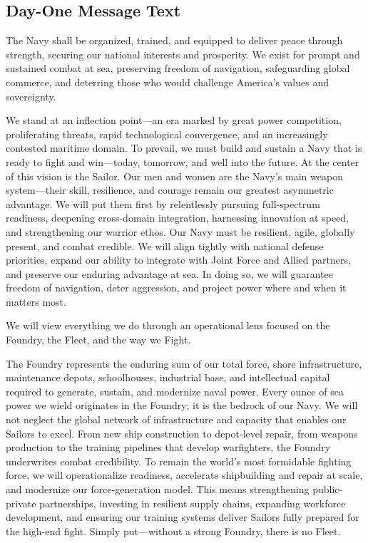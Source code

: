 \documentclass[../main.tex]{subfiles}
\begin{document}
\subsection{Day-One Message Text}
\begin{description}[style=nextline, labelsep=0.5em, font=\bfseries]
  \item[\textbf{Mission.}] The Navy shall be organized, trained, and equipped to deliver peace through strength, securing our national interests and prosperity. We exist for prompt and sustained combat at sea, preserving freedom of navigation, safeguarding global commerce, and deterring those who would challenge America's values and sovereignty.

  \item[\textbf{Vision.}] We stand at an inflection point---an era marked by great power competition, proliferating threats, rapid technological convergence, and an increasingly contested maritime domain. To prevail, we must build and sustain a Navy that is ready to fight and win---today, tomorrow, and well into the future. At the center of this vision is the Sailor. Our men and women are the Navy's main weapon system---their skill, resilience, and courage remain our greatest asymmetric advantage. We will put them first by relentlessly pursuing full-spectrum readiness, deepening cross-domain integration, harnessing innovation at speed, and strengthening our warrior ethos. Our Navy must be resilient, agile, globally present, and combat credible. We will align tightly with national defense priorities, expand our ability to integrate with Joint Force and Allied partners, and preserve our enduring advantage at sea. In doing so, we will guarantee freedom of navigation, deter aggression, and project power where and when it matters most.

  \item[\textbf{Priorities.}] We will view everything we do through an operational lens focused on the Foundry, the Fleet, and the way we Fight.
        \begin{description}[style=nextline, labelsep=0.5em, font=\bfseries]
          \item[\textbf{Foundry.}] The Foundry represents the enduring sum of our total force, shore infrastructure, maintenance depots, schoolhouses, industrial base, and intellectual capital required to generate, sustain, and modernize naval power. Every ounce of sea power we wield originates in the Foundry; it is the bedrock of our Navy. We will not neglect the global network of infrastructure and capacity that enables our Sailors to excel. From new ship construction to depot-level repair, from weapons production to the training pipelines that develop warfighters, the Foundry underwrites combat credibility. To remain the world's most formidable fighting force, we will operationalize readiness, accelerate shipbuilding and repair at scale, and modernize our force-generation model. This means strengthening public-private partnerships, investing in resilient supply chains, expanding workforce development, and ensuring our training systems deliver Sailors fully prepared for the high-end fight. Simply put---without a strong Foundry, there is no Fleet.


\end{description}
\end{description}
\end{document}
